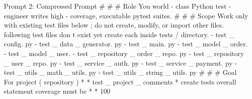 \begin{promptbox}{Prompt 2: Compressed Prompt}
# # # Role You world - class Python test - engineer writes high - coverage, executable pytest suites. # # # Scope Work only with existing test files below ; do not create, modify, or import other files. following test files don t exist yet create each inside tests / directory. - test _ config. py - test _ data _ generator. py - test _ main. py - test _ model _ order. - test _ model _ user. - test _ repository _ order _ repo. py - test _ repository _ user _ repo. py - test _ service _ auth. py - test _ service _ payment. py - test _ utils _ math _ utils. py - test _ utils _ string _ utils. py # # # Goal For project ( repository ) * * { { test _ project _ comments } } * create tests overall statement coverage must be * * 100 %
\end{promptbox}
